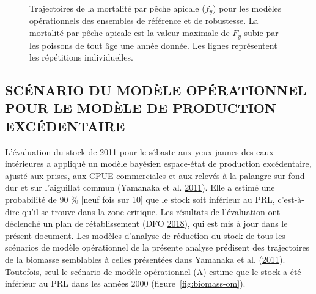 \documentclass[french,11pt]{book}
\begin{document}
\begin{figure}[htb]

{\centering {} 

}

\caption{Trajectoires de la mortalité par pêche apicale (\(f_y\)) pour les modèles opérationnels des ensembles de référence et de robustesse. La mortalité par pêche apicale est la valeur maximale de \(F_y\) subie par les poissons de tout âge une année donnée. Les lignes représentent les répétitions individuelles.}\label{fig:F-om}
\end{figure}
\clearpage

\hypertarget{scuxe9nario-du-moduxe8le-opuxe9rationnel-pour-le-moduxe8le-de-production-excuxe9dentaire}{%
\subsection{SCÉNARIO DU MODÈLE OPÉRATIONNEL POUR LE MODÈLE DE PRODUCTION EXCÉDENTAIRE}\label{scuxe9nario-du-moduxe8le-opuxe9rationnel-pour-le-moduxe8le-de-production-excuxe9dentaire}}

L'évaluation du stock de 2011 pour le sébaste aux yeux jaunes des eaux intérieures a appliqué un modèle bayésien espace-état de production excédentaire, ajusté aux prises, aux CPUE commerciales et aux relevés à la palangre sur fond dur et sur l'aiguillat commun (Yamanaka et al. \protect\hyperlink{ref-yamanaka2011}{2011}). Elle a estimé une probabilité de 90 \% {[}neuf fois sur 10{]} que le stock soit inférieur au PRL, c'est-à-dire qu'il se trouve dans la zone critique. Les résultats de l'évaluation ont déclenché un plan de rétablissement (DFO \protect\hyperlink{ref-ifmp2018}{2018}), qui est mis à jour dans le présent document. Les modèles d'analyse de réduction du stock de tous les scénarios de modèle opérationnel de la présente analyse prédisent des trajectoires de la biomasse semblables à celles présentées dans Yamanaka et al. (\protect\hyperlink{ref-yamanaka2011}{2011}). Toutefois, seul le scénario de modèle opérationnel (A) estime que le stock a été inférieur au PRL dans les années 2000 (figure~\ref{fig:biomass-om}).
\end{document}
